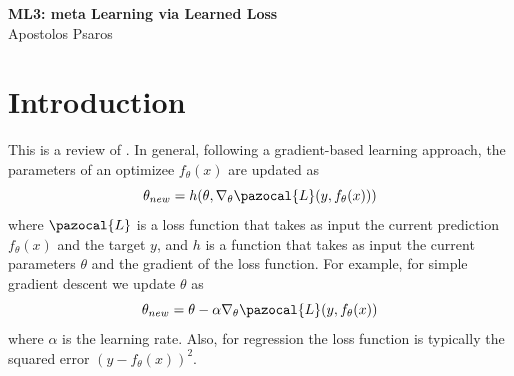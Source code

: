 

\newcommand{\bw}{\boldsymbol{w}}
\newcommand{\bp}{\boldsymbol{p}}
\newcommand{\bth}{\boldsymbol{\theta}}
\newcommand{\bA}{\boldsymbol{A}}
\newcommand{\cH}{\pazocal{H}}
\newcommand{\cN}{\pazocal{N}}
\newcommand{\cP}{\pazocal{P}}
\newcommand{\cD}{\pazocal{D}}
\newcommand{\cO}{\pazocal{O}}
\newcommand{\cL}{\pazocal{L}}


\setcounter{tocdepth}{3}

\usepackage[ruled,vlined]{algorithm2e}

	
	\sloppy
	
	\begin{center}	
		\Large
		\textbf{ML3: meta Learning via Learned Loss}\\
		\large
		Apostolos Psaros\\	
	\end{center}
	\vskip 0.25in
	



\section{Introduction}

This is a review of \textcite{bechtle2020metalearning}.
In general, following a gradient-based learning approach, the parameters of an optimizee $f_{\theta}(x)$ are updated as
\begin{equation}
	\theta_{new} = h(\theta, \nabla_{\theta}\pazocal{L}(y, f_{\theta}(x)))
\end{equation}
where $\pazocal{L}$ is a loss function that takes as input the current prediction $f_{\theta}(x)$ and the target $y$, and $h$ is a function that takes as input the current parameters $\theta$ and the gradient of the loss function. 
For example, for simple gradient descent we update $\theta$ as
\begin{equation}\label{eq:update_step}
	\theta_{new} = \theta - \alpha \nabla_{\theta}\pazocal{L}(y, f_{\theta}(x))
\end{equation}
where $\alpha$ is the learning rate.
Also, for regression the loss function is typically the squared error $(y-f_{\theta}(x))^2$.

